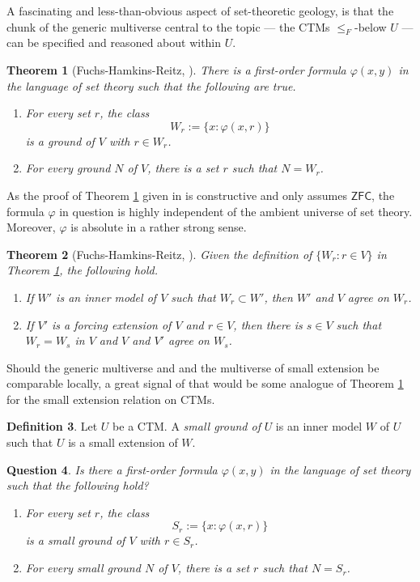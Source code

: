 \documentclass[12pt, twoside]{memoir}
\numberwithin{equation}{section}
\newtheorem{thm}{Theorem}[section]
\newtheorem{ques}[thm]{Question}
\theoremstyle{definition}
\newtheorem{defi}[thm]{Definition}
\theoremstyle{remark}
\theoremstyle{definition}
\theoremstyle{definition}
\theoremstyle{definition}
\theoremstyle{remark}
\begin{document}
A fascinating and less-than-obvious aspect of set-theoretic geology, is that the chunk of the generic multiverse central to the topic --- the CTMs $\leq_F$-below $U$ --- can be specified and reasoned about within $U$. 

\begin{thm}[Fuchs-Hamkins-Reitz, \cite{fuchs}]\label{fhr}
There is a first-order formula $\varphi(x, y)$ in the language of set theory such that the following are true.
\begin{enumerate}[label=(\arabic*)]
    \item For every set $r$, the class $$W_r := \{x : \varphi(x, r)\}$$ is a ground of $V$ with $r \in W_r$.
    \item For every ground $N$ of $V$, there is a set $r$ such that $N = W_r$.
\end{enumerate}
\end{thm}

As the proof of Theorem \ref{fhr} given in \cite{fuchs} is constructive and only assumes $\mathsf{ZFC}$, the formula $\varphi$ in question is highly independent of the ambient universe of set theory. Moreover, $\varphi$ is absolute in a rather strong sense.

\begin{thm}[Fuchs-Hamkins-Reitz, \cite{fuchs}]\label{fhr2}
Given the definition of $\{W_r : r \in V\}$ in Theorem \ref{fhr}, the following hold.
\begin{enumerate}[label=(\arabic*)]
    \item If $W'$ is an inner model of $V$ such that $W_r \subset W'$, then $W'$ and $V$ agree on $W_r$.
    \item If $V'$ is a forcing extension of $V$ and $r \in V$, then there is $s \in V$ such that $W_r = W_s$ in $V$ and $V$ and $V'$ agree on $W_s$.
\end{enumerate}
\end{thm}

Should the generic multiverse and and the multiverse of small extension be comparable locally, a great signal of that would be some analogue of Theorem \ref{fhr} for the small extension relation on CTMs.

\begin{defi}
Let $U$ be a CTM. A \emph{small ground of} $U$ is an inner model $W$ of $U$ such that $U$ is a small extension of $W$.
\end{defi}

\begin{ques}
Is there a first-order formula $\varphi(x, y)$ in the language of set theory such that the following hold?
\begin{enumerate}[label=(\arabic*)]
    \item For every set $r$, the class $$S_r := \{x : \varphi(x, r)\}$$ is a small ground of $V$ with $r \in S_r$.
    \item For every small ground $N$ of $V$, there is a set $r$ such that $N = S_r$.
\end{enumerate}
\end{ques}
\end{document}
